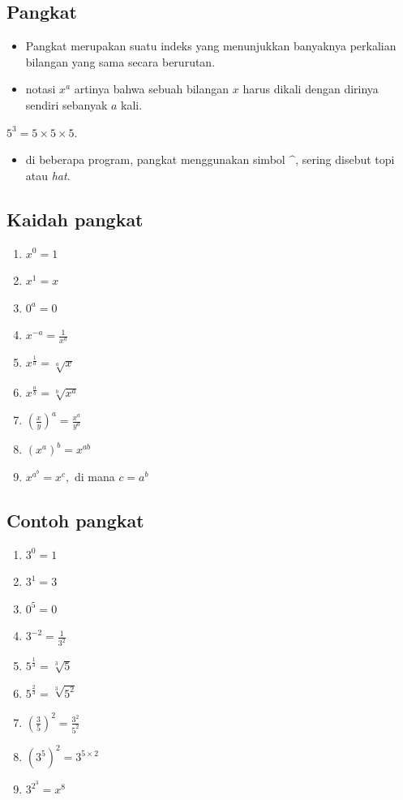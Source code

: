 \documentclass[
  letterpaper,
  DIV=11,
  numbers=noendperiod]{scrartcl}
\providecommand{\tightlist}{%
  \setlength{\itemsep}{0pt}\setlength{\parskip}{0pt}}\usepackage{longtable,booktabs,array}
\begin{document}
\subsection{Pangkat}\label{pangkat}

\begin{itemize}
\item
  Pangkat merupakan suatu indeks yang menunjukkan banyaknya perkalian
  bilangan yang sama secara berurutan.
\item
  notasi \(x^a\) artinya bahwa sebuah bilangan \(x\) harus dikali dengan
  dirinya sendiri sebanyak \(a\) kali.
\end{itemize}

\(5^3=5 \times 5 \times 5\).

\begin{itemize}
\tightlist
\item
  di beberapa program, pangkat menggunakan simbol \(\^\), sering disebut
  topi atau \emph{hat}.
\end{itemize}

\subsection{Kaidah pangkat}\label{kaidah-pangkat}

\begin{enumerate}
\def\labelenumi{\arabic{enumi}.}
\item
  \(x^0=1\)
\item
  \(x^1=x\)
\item
  \(0^a=0\)
\item
  \(x^{-a}=\frac{1}{x^a}\)
\item
  \(x^{\frac{1}{a}}=\sqrt[a]{x}\)
\item
  \(x^{\frac{a}{b}}=\sqrt[b]{x^a}\)
\item
  \({\left(\frac{x}{y}\right)}^a=\frac{x^a}{y^a}\)
\item
  \(\left(x^a\right)^b=x^{ab}\)
\item
  \(x^{a^b}=x^c,\) di mana \(c=a^b\)
\end{enumerate}

\subsection{Contoh pangkat}\label{contoh-pangkat}

\begin{enumerate}
\def\labelenumi{\arabic{enumi}.}
\item
  \(3^0=1\)
\item
  \(3^1=3\)
\item
  \(0^5=0\)
\item
  \(3^{-2}=\frac{1}{3^2}\)
\item
  \(5^{\frac{1}{3}}=\sqrt[3]{5}\)
\item
  \(5^{\frac{2}{3}}=\sqrt[3]{5^2}\)
\item
  \({\left(\frac{3}{5}\right)}^2=\frac{3^2}{5^2}\)
\item
  \(\left(3^5\right)^2=3^{5\times 2}\)
\item
  \(3^{2^3}=x^8\)
\end{enumerate}
\end{document}
